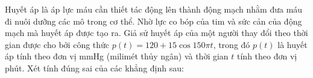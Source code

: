 \begin{ex}
Huyết áp là áp lực máu cần thiết tác động lên thành động mạch nhằm đưa máu đi nuôi dưỡng các mô trong cơ thể. Nhờ lực co bóp của tim và sức cản của động mạch mà huyết áp được tạo ra. Giả sử huyết áp của một người thay đổi theo thời gian được cho bởi công thức $p(t)=120+15\cos150\pi t$, trong đó $p(t)$ là huyết áp tính theo đơn vị mmHg (milimét thủy ngân) và thời gian $t$ tính theo đơn vị phút. Xét tính đúng sai của các khẳng định sau:
\end{ex}
